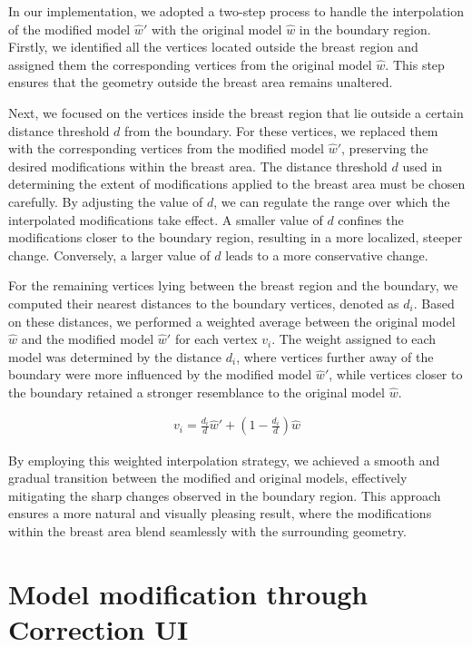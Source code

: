 In our implementation, we adopted a two-step process to handle the interpolation of the modified model $\hat{w}'$ with the original model $\hat{w}$ in the boundary region. Firstly, 
we identified all the vertices located outside the breast region and assigned them the corresponding vertices from the original model $\hat{w}$. This step ensures that the geometry 
outside the breast area remains unaltered.

Next, we focused on the vertices inside the breast region that lie outside a certain distance threshold $d$ from the boundary. For these vertices, we replaced them with the corresponding 
vertices from the modified model $\hat{w}'$, preserving the desired modifications within the breast area. The distance threshold $d$ used in determining the extent of 
modifications applied to the breast area must be chosen carefully. By adjusting the value of $d$, we can regulate the range over which the interpolated modifications take effect. 
A smaller value of $d$ confines the modifications closer to the boundary region, resulting in a more localized, steeper change. Conversely, a larger value of $d$ leads to a more conservative
change.

For the remaining vertices lying between the breast region and the boundary, we computed their nearest distances to the boundary vertices, denoted as $d_i$. Based on these distances, 
we performed a weighted average between the original model $\hat{w}$ and the modified model $\hat{w}'$ for each vertex $v_i$. The weight assigned to each model was determined by the 
distance $d_i$, where vertices further away of the boundary were more influenced by the modified model $\hat{w}'$, while vertices closer to the boundary retained a stronger resemblance to the 
original model $\hat{w}$.

\begin{align}\label{eq:interpolation}
    v_i = \frac{d_i}{d} \hat{w} ' + \left(1 - \frac{d_i}{d}\right) \hat{w}
\end{align}

By employing this weighted interpolation strategy, we achieved a smooth and gradual transition between the modified and original models, effectively mitigating the sharp changes 
observed in the boundary region. This approach ensures a more natural and visually pleasing result, where the modifications within the breast area blend seamlessly with the 
surrounding geometry.

\section{Model modification through Correction UI}

